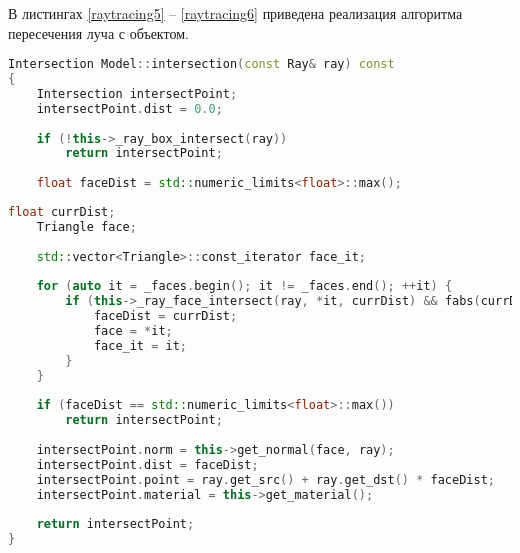 В листингах \ref{raytracing5} -- \ref{raytracing6}   приведена реализация алгоритма пересечения луча с объектом.

\begin{lstlisting}[label=raytracing5,caption=Реализация алгоритма пересечения луча с объектом (начало), language=C++]
Intersection Model::intersection(const Ray& ray) const
{
	Intersection intersectPoint;
	intersectPoint.dist = 0.0;
	
	if (!this->_ray_box_intersect(ray))
		return intersectPoint;
	
	float faceDist = std::numeric_limits<float>::max();
\end{lstlisting}
\begin{lstlisting}[label=raytracing6,caption=Реализация алгоритма пересечения луча с объектом (конец), language=C++]
	float currDist;
	Triangle face;
	
	std::vector<Triangle>::const_iterator face_it;
	
	for (auto it = _faces.begin(); it != _faces.end(); ++it) {
		if (this->_ray_face_intersect(ray, *it, currDist) && fabs(currDist) < faceDist) {
			faceDist = currDist;
			face = *it;
			face_it = it;
		}
	}
	
	if (faceDist == std::numeric_limits<float>::max())
		return intersectPoint;
	
	intersectPoint.norm = this->get_normal(face, ray);
	intersectPoint.dist = faceDist;
	intersectPoint.point = ray.get_src() + ray.get_dst() * faceDist;
	intersectPoint.material = this->get_material();
	
	return intersectPoint;
}
\end{lstlisting}

